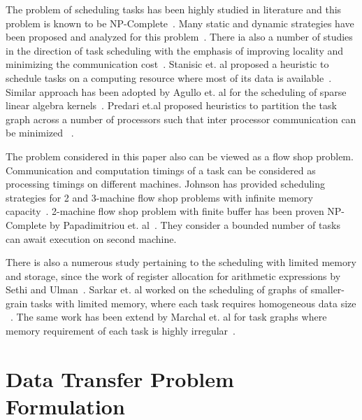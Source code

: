 \documentclass[sigconf]{acmart}
\begin{document}
	
	The problem of scheduling tasks has been highly studied in literature and this problem is known to be NP-Complete~\cite{GareyJohnson}. Many static and dynamic strategies have been proposed and analyzed for this problem~\cite{heft-Topcuoglu,hipc16multiresource,ipdps16starpu}. There ia also a number of studies in the direction of task scheduling with the emphasis of improving locality and minimizing the communication cost~\cite{starpu,heft-Topcuoglu}. Stanisic et. al proposed a heuristic to schedule tasks on a computing resource where most of its data is available~\cite{luka-dmdar}. Similar approach has been adopted by Agullo et. al for the scheduling of sparse linear algebra kernels~\cite{agullo_fmm}. Predari et.al proposed heuristics to partition the task graph across a number of processors such that inter processor communication can be minimized ~\cite{predari:tel-01518956}.
	
	The problem considered in this paper also can be viewed as a flow shop problem. Communication and computation timings of a task can be considered as processing timings on different machines. Johnson has provided scheduling strategies for 2 and 3-machine flow shop problems with infinite memory capacity~\cite{johnson}. 2-machine flow shop problem with finite buffer has been proven NP-Complete by Papadimitriou et. al~\cite{Papadimitriou:1980:FSL:322203.322213}. They consider a bounded number of tasks can await execution on second machine.
	
	There is also a numerous study pertaining to the scheduling with limited memory and storage, since the work of register allocation for arithmetic expressions by Sethi and Ulman~\cite{Sethi:1970:GOC:321607.321620}. Sarkar et. al worked on the scheduling of graphs of smaller-grain tasks with limited memory, where each task requires homogeneous data size ~\cite{vsarkar-pact}. The same work has been extend by Marchal et. al for task graphs where memory requirement of each task is highly irregular~\cite{loris-ipdps18}.
	
	
	
	\section{Data Transfer Problem Formulation}
	\label{sec:theoreticalProof}
	
\end{document}
